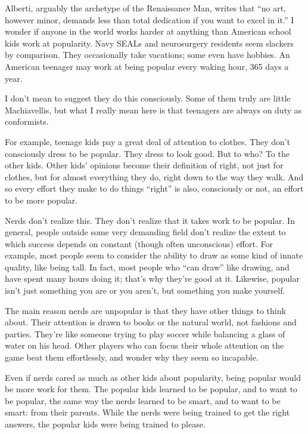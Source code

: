 Alberti, arguably the archetype of the Renaissance Man, writes that ``no
art, however minor, demands less than total dedication if you want to
excel in it.'' I wonder if anyone in the world works harder at anything
than American school kids work at popularity. Navy SEALs and
neurosurgery residents seem slackers by comparison. They occasionally
take vacations; some even have hobbies. An American teenager may work at
being popular every waking hour, 365 days a year.

I don't mean to suggest they do this consciously. Some of them truly are
little Machiavellis, but what I really mean here is that teenagers are
always on duty as conformists.

For example, teenage kids pay a great deal of attention to clothes. They
don't consciously dress to be popular. They dress to look good. But to
who? To the other kids. Other kids' opinions become their definition of
right, not just for clothes, but for almost everything they do, right
down to the way they walk. And so every effort they make to do things
``right'' is also, consciously or not, an effort to be more popular.

Nerds don't realize this. They don't realize that it takes work to be
popular. In general, people outside some very demanding field don't
realize the extent to which success depends on constant (though often
unconscious) effort. For example, most people seem to consider the
ability to draw as some kind of innate quality, like being tall. In
fact, most people who ``can draw'' like drawing, and have spent many
hours doing it; that's why they're good at it. Likewise, popular isn't
just something you are or you aren't, but something you make yourself.

The main reason nerds are unpopular is that they have other things to
think about. Their attention is drawn to books or the natural world, not
fashions and parties. They're like someone trying to play soccer while
balancing a glass of water on his head. Other players who can focus
their whole attention on the game beat them effortlessly, and wonder why
they seem so incapable.

Even if nerds cared as much as other kids about popularity, being
popular would be more work for them. The popular kids learned to be
popular, and to want to be popular, the same way the nerds learned to be
smart, and to want to be smart: from their parents. While the nerds were
being trained to get the right answers, the popular kids were being
trained to please.

